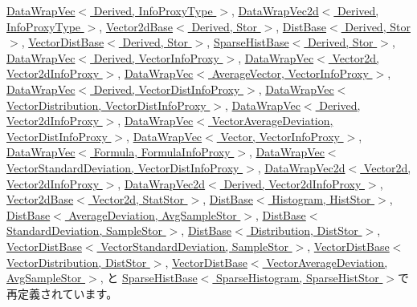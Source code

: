 \hyperlink{classStats_1_1DataWrapVec_a76d2c248839f34168d2a3760bc1fbdb9}{DataWrapVec$<$ Derived, InfoProxyType $>$}, \hyperlink{classStats_1_1DataWrapVec2d_a76d2c248839f34168d2a3760bc1fbdb9}{DataWrapVec2d$<$ Derived, InfoProxyType $>$}, \hyperlink{classStats_1_1Vector2dBase_a54a1e5a7adf65227680acc9effe631ac}{Vector2dBase$<$ Derived, Stor $>$}, \hyperlink{classStats_1_1DistBase_a6c7ed3194655a4ace77fb6881fee9f69}{DistBase$<$ Derived, Stor $>$}, \hyperlink{classStats_1_1VectorDistBase_a15ec5f8f1a2c998c2496fad068947481}{VectorDistBase$<$ Derived, Stor $>$}, \hyperlink{classStats_1_1SparseHistBase_a0af9f4fe80bc5e1ee0b1d79bd353c504}{SparseHistBase$<$ Derived, Stor $>$}, \hyperlink{classStats_1_1DataWrapVec_a76d2c248839f34168d2a3760bc1fbdb9}{DataWrapVec$<$ Derived, VectorInfoProxy $>$}, \hyperlink{classStats_1_1DataWrapVec_a76d2c248839f34168d2a3760bc1fbdb9}{DataWrapVec$<$ Vector2d, Vector2dInfoProxy $>$}, \hyperlink{classStats_1_1DataWrapVec_a76d2c248839f34168d2a3760bc1fbdb9}{DataWrapVec$<$ AverageVector, VectorInfoProxy $>$}, \hyperlink{classStats_1_1DataWrapVec_a76d2c248839f34168d2a3760bc1fbdb9}{DataWrapVec$<$ Derived, VectorDistInfoProxy $>$}, \hyperlink{classStats_1_1DataWrapVec_a76d2c248839f34168d2a3760bc1fbdb9}{DataWrapVec$<$ VectorDistribution, VectorDistInfoProxy $>$}, \hyperlink{classStats_1_1DataWrapVec_a76d2c248839f34168d2a3760bc1fbdb9}{DataWrapVec$<$ Derived, Vector2dInfoProxy $>$}, \hyperlink{classStats_1_1DataWrapVec_a76d2c248839f34168d2a3760bc1fbdb9}{DataWrapVec$<$ VectorAverageDeviation, VectorDistInfoProxy $>$}, \hyperlink{classStats_1_1DataWrapVec_a76d2c248839f34168d2a3760bc1fbdb9}{DataWrapVec$<$ Vector, VectorInfoProxy $>$}, \hyperlink{classStats_1_1DataWrapVec_a76d2c248839f34168d2a3760bc1fbdb9}{DataWrapVec$<$ Formula, FormulaInfoProxy $>$}, \hyperlink{classStats_1_1DataWrapVec_a76d2c248839f34168d2a3760bc1fbdb9}{DataWrapVec$<$ VectorStandardDeviation, VectorDistInfoProxy $>$}, \hyperlink{classStats_1_1DataWrapVec2d_a76d2c248839f34168d2a3760bc1fbdb9}{DataWrapVec2d$<$ Vector2d, Vector2dInfoProxy $>$}, \hyperlink{classStats_1_1DataWrapVec2d_a76d2c248839f34168d2a3760bc1fbdb9}{DataWrapVec2d$<$ Derived, Vector2dInfoProxy $>$}, \hyperlink{classStats_1_1Vector2dBase_a54a1e5a7adf65227680acc9effe631ac}{Vector2dBase$<$ Vector2d, StatStor $>$}, \hyperlink{classStats_1_1DistBase_a6c7ed3194655a4ace77fb6881fee9f69}{DistBase$<$ Histogram, HistStor $>$}, \hyperlink{classStats_1_1DistBase_a6c7ed3194655a4ace77fb6881fee9f69}{DistBase$<$ AverageDeviation, AvgSampleStor $>$}, \hyperlink{classStats_1_1DistBase_a6c7ed3194655a4ace77fb6881fee9f69}{DistBase$<$ StandardDeviation, SampleStor $>$}, \hyperlink{classStats_1_1DistBase_a6c7ed3194655a4ace77fb6881fee9f69}{DistBase$<$ Distribution, DistStor $>$}, \hyperlink{classStats_1_1VectorDistBase_a15ec5f8f1a2c998c2496fad068947481}{VectorDistBase$<$ VectorStandardDeviation, SampleStor $>$}, \hyperlink{classStats_1_1VectorDistBase_a15ec5f8f1a2c998c2496fad068947481}{VectorDistBase$<$ VectorDistribution, DistStor $>$}, \hyperlink{classStats_1_1VectorDistBase_a15ec5f8f1a2c998c2496fad068947481}{VectorDistBase$<$ VectorAverageDeviation, AvgSampleStor $>$}, と \hyperlink{classStats_1_1SparseHistBase_a0af9f4fe80bc5e1ee0b1d79bd353c504}{SparseHistBase$<$ SparseHistogram, SparseHistStor $>$}で再定義されています。

